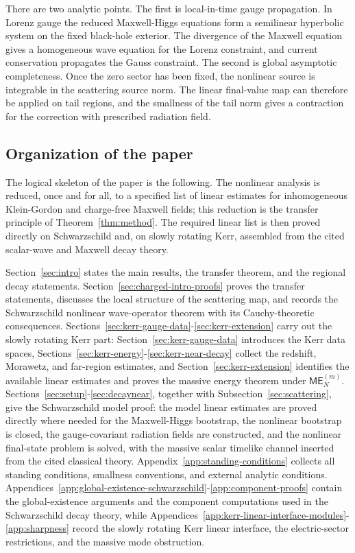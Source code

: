 \documentclass[11pt]{article}
\numberwithin{equation}{section}
\theoremstyle{plain}
\theoremstyle{definition}
\theoremstyle{remark}
\newcommand{\ME}{\mathsf{ME}}
\begin{document}
There are two analytic points.  The first is local-in-time gauge propagation.  In Lorenz gauge the reduced Maxwell-Higgs equations form a semilinear hyperbolic system on the fixed black-hole exterior.  The divergence of the Maxwell equation gives a homogeneous wave equation for the Lorenz constraint, and current conservation propagates the Gauss constraint.  The second is global asymptotic completeness.  Once the zero sector has been fixed, the nonlinear source is integrable in the scattering source norm.  The linear final-value map can therefore be applied on tail regions, and the smallness of the tail norm gives a contraction for the correction with prescribed radiation field.

\subsection{Organization of the paper}\label{subsec:organization}

The logical skeleton of the paper is the following. The nonlinear analysis is reduced, once and for all, to a specified list of linear estimates for inhomogeneous Klein-Gordon and charge-free Maxwell fields; this reduction is the transfer principle of Theorem~\ref{thm:method}. The required linear list is then proved directly on Schwarzschild and, on slowly rotating Kerr, assembled from the cited scalar-wave and Maxwell decay theory.

Section~\ref{sec:intro} states the main results, the transfer theorem, and the regional decay statements. Section~\ref{sec:charged-intro-proofs} proves the transfer statements, discusses the local structure of the scattering map, and records the Schwarzschild nonlinear wave-operator theorem with its Cauchy-theoretic consequences. Sections~\ref{sec:kerr-gauge-data}-\ref{sec:kerr-extension} carry out the slowly rotating Kerr part: Section~\ref{sec:kerr-gauge-data} introduces the Kerr data spaces, Sections~\ref{sec:kerr-energy}-\ref{sec:kerr-near-decay} collect the redshift, Morawetz, and far-region estimates, and Section~\ref{sec:kerr-extension} identifies the available linear estimates and proves the massive energy theorem under \(\ME^{(m)}_N\). Sections~\ref{sec:setup}-\ref{sec:decaynear}, together with Subsection~\ref{sec:scattering}, give the Schwarzschild model proof: the model linear estimates are proved directly where needed for the Maxwell-Higgs bootstrap, the nonlinear bootstrap is closed, the gauge-covariant radiation fields are constructed, and the nonlinear final-state problem is solved, with the massive scalar timelike channel inserted from the cited classical theory. Appendix~\ref{app:standing-conditions} collects all standing conditions, smallness conventions, and external analytic conditions.  Appendices~\ref{app:global-existence-schwarzschild}-\ref{app:component-proofs} contain the global-existence arguments and the component computations used in the Schwarzschild decay theory, while Appendices~\ref{app:kerr-linear-interface-modules}-\ref{app:sharpness} record the slowly rotating Kerr linear interface, the electric-sector restrictions, and the massive mode obstruction.
\end{document}
